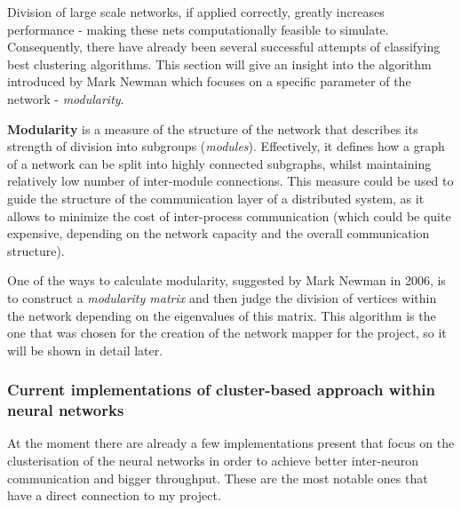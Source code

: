 Division of large scale networks, if applied correctly, greatly increases performance - making these nets computationally feasible to simulate. Consequently, there have already been several successful attempts of classifying best clustering algorithms. This section will give an insight into the algorithm introduced by Mark Newman which focuses on a specific parameter of the network - \emph{modularity}.

\textbf{Modularity} is a measure of the structure of the network that describes its strength of division into subgroups (\emph{modules}).\cite{Newman2004} Effectively, it defines how a graph of a network can be split into highly connected subgraphs, whilst maintaining relatively low number of inter-module connections. This measure could be used to guide the structure of the communication layer of a distributed system, as it allows to minimize the cost of inter-process communication (which could be quite expensive, depending on the network capacity and the overall communication structure).

One of the ways to calculate modularity, suggested by Mark Newman in 2006\cite{Newman2006}, is to construct a \emph{modularity matrix} and then judge the division of vertices within the network depending on the eigenvalues of this matrix. This algorithm is the one that was chosen for the creation of the network mapper for the project, so it will be shown in detail later.

\subsubsection{Current implementations of cluster-based approach within neural networks}
At the moment there are already a few implementations present that focus on the clusterisation of the neural networks in order to achieve better inter-neuron communication and bigger throughput. 
These are the most notable ones that have a direct connection to my project.

